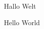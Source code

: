 \documentclass[
	final,
	a4paper,
	oneside,
	parskip=full,
	headings=standardclasses,
	headings=big,
	pointednumbers,
    pagesize,
    fleqn
]{scrartcl}
\begin{document}
    \newcommand{\mys}{\; Hallo Welt}

    \setcounter{myc}{1}

    \newlength{\myf}
    \setlength{\myf}{12.5mm}
    
    \themyc \;  \mys \; \printlength{\myf}
    
    \renewcommand{\mys}{\; Hello World}
    
    \themyc \;  \mys
\end{document}
